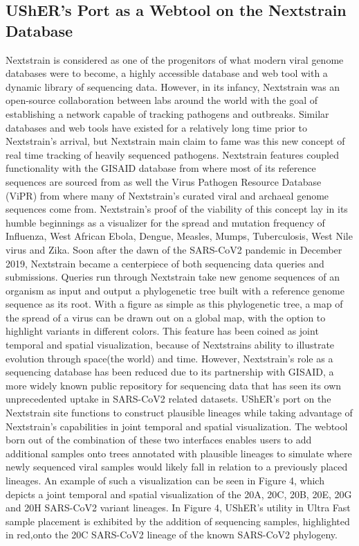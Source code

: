 \documentclass[12pt,journal,compsoc]{IEEEtran}
\begin{document}
\subsection{UShER's Port as a Webtool on the Nextstrain Database}
Nextstrain is considered as one of the progenitors of what modern viral genome databases were to become, a highly accessible database and web tool with a dynamic library of sequencing data. However, in its infancy, Nextstrain was an open-source collaboration between labs around the world with the goal of establishing a network capable of tracking pathogens and outbreaks. Similar databases and web tools have existed for a relatively long time prior to Nextstrain’s arrival, but Nextstrain main claim to fame was this new concept of real time tracking of heavily sequenced pathogens\cite{binf:ox}. Nextstrain features coupled functionality with the GISAID database from where most of its reference sequences are sourced from as well the Virus Pathogen Resource Database (ViPR) from where many of Nextstrain's curated viral and archaeal genome sequences come from. Nextstrain’s proof of the viability of this concept lay in its humble beginnings as a visualizer for the spread and mutation frequency of Influenza, West African Ebola, Dengue, Measles, Mumps, Tuberculosis, West Nile virus and Zika. Soon after the dawn of the SARS-CoV2 pandemic in December 2019, Nextstrain became a centerpiece of both sequencing data queries and submissions. Queries run through Nextstrain take new genome sequences of an organism as input and output a phylogenetic tree built with a reference genome sequence as its root. With a figure as simple as this phylogenetic tree, a map of the spread of a virus can be drawn out on a global map, with the option to highlight variants in different colors. This feature has been coined as joint temporal and spatial visualization, because of Nextstrains ability to illustrate evolution through space(the world) and time. However, Nextstrain’s role as a sequencing database has been reduced due to its partnership with GISAID, a more widely known public repository for sequencing data that has seen its own unprecedented uptake in SARS-CoV2 related datasets. UShER’s port on the Nextstrain site functions to construct plausible lineages while taking advantage of Nextstrain’s capabilities in joint temporal and spatial visualization. The webtool born out of the combination of these two interfaces enables users to add additional samples onto trees annotated with plausible lineages to simulate where newly sequenced viral samples would likely fall in relation to a previously placed lineages. An example of such a visualization can be seen in Figure 4, which depicts a joint temporal and spatial visualization of the 20A, 20C, 20B, 20E, 20G and 20H SARS-CoV2 variant lineages. In Figure 4, UShER’s utility in Ultra Fast sample placement is exhibited by the addition of sequencing samples, highlighted in red,onto the 20C SARS-CoV2 lineage of the known SARS-CoV2 phylogeny.
\end{document}
